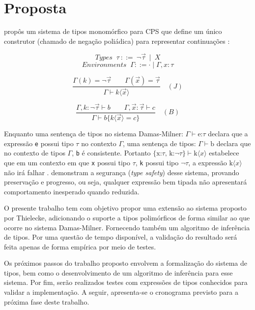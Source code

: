 \chapter{Proposta}\label{ch:proposta}

 propôs um sistema de tipos monomórfico para CPS que define um único construtor (chamado de negação poliádica) para representar continuações \cite{TORRENS2024}:


\[
    \textit{Types } \ \tau \ ::= \ \neg \vec{\tau} \ \mid \ X
\]
\[
    \textit{Environments } \ \Gamma ::= \cdot \mid \Gamma, x : \tau
\]

\[
\frac{
  \Gamma(k) = \neg \vec{\tau} 
  \quad \quad
  \Gamma(\vec{x}) = \vec{\tau}
}{
  \Gamma \vdash k\langle \vec{x} \rangle
} \quad (J)
\]

\[
\frac{
  \Gamma, k : \neg \vec{\tau} \vdash b
  \quad \quad
  \Gamma, \vec{x} : \vec{\tau} \vdash c
}{
  \Gamma \vdash b \{ k \langle \vec{x} \rangle = c \}
} \quad (B)
\]

Enquanto uma sentença de tipos no sistema Damas-Milner: $\Gamma \vdash \text{e:}\tau$ declara que a expressão \texttt{e} possui tipo $\tau$ no contexto $\Gamma$, uma sentença de tipos: $\Gamma \vdash \text{b}$ declara que no contexto de tipos $\Gamma$, \texttt{b} é consistente.
Portanto $\{\text{x:}\tau \text{, k:} \neg \tau\} \vdash \text{k}\langle x \rangle$ estabelece que em um contexto em que \texttt{x} possui tipo $\tau$, \texttt{k} possui tipo $\neg \tau$, a expressão $\text{k}\langle x \rangle$ não irá falhar \cite{thielecke1997}.
 demonstram a segurança (\textit{type safety}) desse sistema, provando preservação e progresso, ou seja, qualquer expressão bem tipada não apresentará comportamento inesperado quando reduzida.

O presente trabalho tem com objetivo propor uma extensão ao sistema proposto por Thielecke, adicionando o suporte a tipos polimórficos de forma similar ao que ocorre no sistema Damas-Milner.
Fornecendo também um algoritmo de inferência de tipos.
Por uma questão de tempo disponível, a validação do resultado será feita apenas de forma empírica por meio de testes.

Os próximos passos do trabalho proposto envolvem a formalização do sistema de tipos, bem como o desenvolvimento de um algoritmo de inferência para esse sistema.
Por fim, serão realizados testes com expressões de tipos conhecidos para validar a implementação.
A seguir, apresenta-se o cronograma previsto para a próxima fase deste trabalho.

